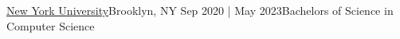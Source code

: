 \resumeSubheadingEdu
{\href{https://engineering.nyu.edu}{New York University}}{Brooklyn, NY}
{Sep 2020 | May 2023}{Bachelors of Science in Computer Science }
